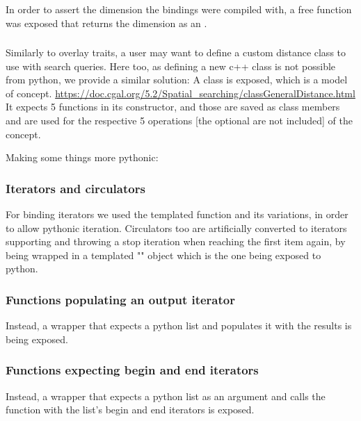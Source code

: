 In order to assert the dimension the bindings were compiled with, a
free function  was
exposed that returns the dimension as an .

\subsubsection{}
\label{sec:bind:code:distance}
Similarly to overlay traits, a user may want to define a custom
distance class to use with search queries. Here too, as defining a new
c++ class is not possible from python, we provide a similar solution:
A  class is exposed, which is a model of
 concept.
\url{https://doc.cgal.org/5.2/Spatial_searching/classGeneralDistance.html}
It expects 5 functions in its constructor, and those are saved as
class members and are used for the respective 5 operations [the
optional are not included] of the concept.

Making some things more pythonic:

\subsubsection{Iterators and circulators}
\label{sec:bind:code:iters}
For binding iterators we used the 
templated function and its variations, in order to allow pythonic
iteration. Circulators too are artificially converted to iterators
supporting  and throwing a stop iteration when
reaching the first item again, by being wrapped in a templated
"" object which is the one being
exposed to python.

\subsubsection{Functions populating an output iterator}
\label{sec:bind:code:fnc-out}
Instead, a wrapper that expects a python list and populates it with
the results is being exposed.

\subsubsection{Functions expecting begin and end iterators}
\label{sec:bind:code:fnc-range}
Instead, a wrapper that expects a python list as an argument and calls
the function with the list's begin and end iterators is exposed.
